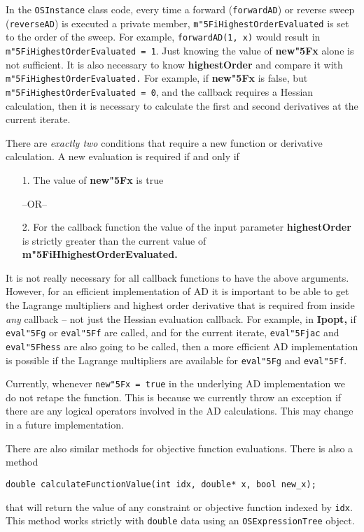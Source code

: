 \documentclass[11pt]{article}
\renewcommand{\_}{{\char"5F}}
\renewcommand{\{}{{\char"7B}}
\renewcommand{\}}{{\char"7D}}
\renewcommand{\^}{{\char"0D}}
\renewcommand{\'}{{\char"0D}}
\begin{document}
In the {\tt OSInstance} class code,  every time a forward ({\tt forwardAD}) or reverse sweep ({\tt reverseAD}) is executed a private  member, {\tt m\_iHighestOrderEvaluated}  is  set to the order of the sweep. For example, {\tt forwardAD(1, x)} would result in {\tt  m\_iHighestOrderEvaluated = 1}.  Just knowing the value  of {\bf new\_x} alone is not sufficient. It is also necessary  to know {\bf highestOrder} and compare it with {\tt m\_iHighestOrderEvaluated.}  For example, if  {\bf new\_x}  is  false,  but {\tt m\_iHighestOrderEvaluated = 0},  and   the callback requires a Hessian calculation, then it is necessary to calculate the first and second derivatives at the current iterate. 

There are {\it  exactly two} conditions that  require a new function or derivative calculation.   A new evaluation is required if and only if

\begin{itemize}
\item[1.]   The value of {\bf new\_x} is  true

\begin{center}
 --OR--
\end{center}


\item[2.] For the callback function the value of the input parameter {\bf highestOrder} is strictly greater than the current value  of    {\bf m\_iHhighestOrderEvaluated.} 
\end{itemize}

It is not really necessary for all callback functions to have the above arguments. However, for an efficient implementation of AD it is important to be able to get the Lagrange multipliers and highest order derivative that is required from inside {\it any} callback -- not just the Hessian evaluation callback. For example, in {\bf Ipopt,} if  {\tt eval\_g}  or {\tt eval\_f} are called, and  for the current iterate, {\tt eval\_jac} and {\tt eval\_hess} are also going to be called, then  a more efficient AD implementation is possible if the Lagrange multipliers are available for {\tt eval\_g} and {\tt eval\_f}. 

Currently, whenever {\tt new\_x = true} in the underlying AD implementation we do not retape the function. This is because we currently throw an exception if there are any logical operators involved in the AD calculations. This may change in a future implementation.


There are also similar methods for objective function evaluations.  There is also a method
\begin{verbatim}
double calculateFunctionValue(int idx, double* x, bool new_x);
\end{verbatim}
that will return the value of any constraint or objective function indexed by {\tt idx}. This method works strictly with {\tt double} data using an {\tt OSExpressionTree} object.
\end{document}
